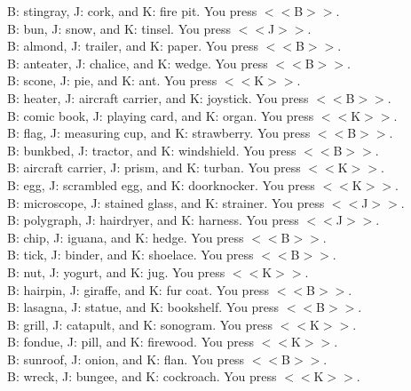 \documentclass[pdflatex,sn-nature]{sn-jnl}%
\theoremstyle{thmstyleone}%
\theoremstyle{thmstyletwo}%
\theoremstyle{thmstylethree}%
\begin{document}
B: stingray, J: cork, and K: fire pit. You press $<<$B$>>$. $~$\\ 
B: bun, J: snow, and K: tinsel. You press $<<$J$>>$. $~$\\ 
B: almond, J: trailer, and K: paper. You press $<<$B$>>$. $~$\\ 
B: anteater, J: chalice, and K: wedge. You press $<<$B$>>$. $~$\\ 
B: scone, J: pie, and K: ant. You press $<<$K$>>$. $~$\\ 
B: heater, J: aircraft carrier, and K: joystick. You press $<<$B$>>$. $~$\\ 
B: comic book, J: playing card, and K: organ. You press $<<$K$>>$. $~$\\ 
B: flag, J: measuring cup, and K: strawberry. You press $<<$B$>>$. $~$\\ 
B: bunkbed, J: tractor, and K: windshield. You press $<<$B$>>$. $~$\\ 
B: aircraft carrier, J: prism, and K: turban. You press $<<$K$>>$. $~$\\ 
B: egg, J: scrambled egg, and K: doorknocker. You press $<<$K$>>$. $~$\\ 
B: microscope, J: stained glass, and K: strainer. You press $<<$J$>>$. $~$\\ 
B: polygraph, J: hairdryer, and K: harness. You press $<<$J$>>$. $~$\\ 
B: chip, J: iguana, and K: hedge. You press $<<$B$>>$. $~$\\ 
B: tick, J: binder, and K: shoelace. You press $<<$B$>>$. $~$\\ 
B: nut, J: yogurt, and K: jug. You press $<<$K$>>$. $~$\\ 
B: hairpin, J: giraffe, and K: fur coat. You press $<<$B$>>$. $~$\\ 
B: lasagna, J: statue, and K: bookshelf. You press $<<$B$>>$. $~$\\ 
B: grill, J: catapult, and K: sonogram. You press $<<$K$>>$. $~$\\ 
B: fondue, J: pill, and K: firewood. You press $<<$K$>>$. $~$\\ 
B: sunroof, J: onion, and K: flan. You press $<<$B$>>$. $~$\\ 
B: wreck, J: bungee, and K: cockroach. You press $<<$K$>>$. 
\end{document}
